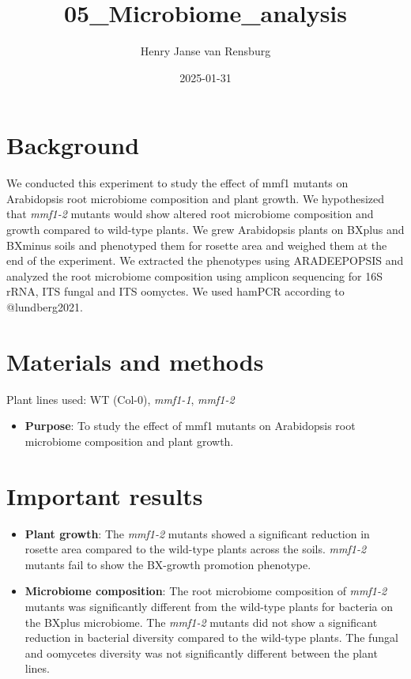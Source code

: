 \documentclass[
  11pt,
]{article}
\title{05\_Microbiome\_analysis}
\author{Henry Janse van Rensburg}
\date{2025-01-31}
\providecommand{\tightlist}{%
  \setlength{\itemsep}{0pt}\setlength{\parskip}{0pt}}\usepackage{longtable,booktabs,array}
\renewcommand*\contentsname{Table of contents}
\newcommand\contentsname{Table of contents}
\begin{document}
\maketitle

\renewcommand*\contentsname{Table of contents}
{
\hypersetup{linkcolor=}
\setcounter{tocdepth}{2}
\tableofcontents
}

\section{Background}\label{background}

We conducted this experiment to study the effect of mmf1 mutants on
Arabidopsis root microbiome composition and plant growth. We
hypothesized that \emph{mmf1-2} mutants would show altered root
microbiome composition and growth compared to wild-type plants. We grew
Arabidopsis plants on BXplus and BXminus soils and phenotyped them for
rosette area and weighed them at the end of the experiment. We extracted
the phenotypes using ARADEEPOPSIS and analyzed the root microbiome
composition using amplicon sequencing for 16S rRNA, ITS fungal and ITS
oomyctes. We used hamPCR according to @lundberg2021.

\section{Materials and methods}\label{materials-and-methods}

Plant lines used: WT (Col-0), \emph{mmf1-1}, \emph{mmf1-2}

\begin{itemize}
\tightlist
\item
  \textbf{Purpose}: To study the effect of mmf1 mutants on Arabidopsis
  root microbiome composition and plant growth.
\end{itemize}

\section{Important results}\label{important-results}

\begin{itemize}
\item
  \textbf{Plant growth}: The \emph{mmf1-2} mutants showed a significant
  reduction in rosette area compared to the wild-type plants across the
  soils. \emph{mmf1-2} mutants fail to show the BX-growth promotion
  phenotype.
\item
  \textbf{Microbiome composition}: The root microbiome composition of
  \emph{mmf1-2} mutants was significantly different from the wild-type
  plants for bacteria on the BXplus microbiome. The \emph{mmf1-2}
  mutants did not show a significant reduction in bacterial diversity
  compared to the wild-type plants. The fungal and oomycetes diversity
  was not significantly different between the plant lines.
\end{itemize}
\end{document}
